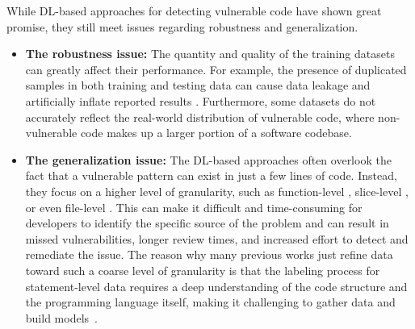 \documentclass{ieeeaccess}
\begin{document}
\par %
While DL-based approaches for detecting vulnerable code have shown great promise, they still meet issues regarding robustness and generalization. 
\begin{itemize}
    \item \textbf{The robustness issue:} The quantity and quality of the training datasets can greatly affect their performance. For example, the presence of duplicated samples in both training and testing data can cause data leakage and artificially inflate reported results \cite{vuldeekeeper, VUDENC, SySeVR, Are}. Furthermore, some datasets \cite{devign, sard, SATE} do not accurately reflect the real-world distribution of vulnerable code, where non-vulnerable code makes up a larger portion of a software codebase. 

    \item \textbf{The generalization issue:} The DL-based approaches often overlook the fact that a vulnerable pattern can exist in just a few lines of code. Instead, they focus on a higher level of granularity, such as function-level \cite{Are, devign, func_level_1,func_level_2,func_level_4}, slice-level \cite{VUDENC, vuldeepeeker2, SySeVR, VulDeeLocator,vuldeekeeper}, or even file-level \cite{File_level_1, File_level_2, File_level_3, file_level_4}. This can make it difficult and time-consuming for developers to identify the specific source of the problem and can result in missed vulnerabilities, longer review times, and increased effort to detect and remediate the issue. The reason why many previous works just refine data toward such a coarse level of granularity is that the labeling process for statement-level data requires a deep understanding of the code structure and the programming language itself, making it challenging to gather data and build models~\cite{Linevd, MVD}.

    
\end{itemize}
\end{document}
